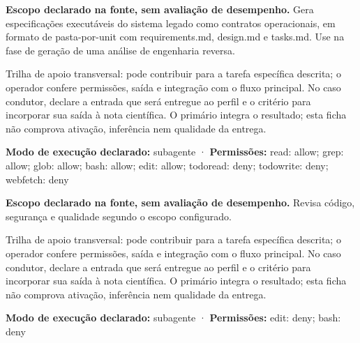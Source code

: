 \begin{descricao}
\textbf{Escopo declarado na fonte, sem avaliação de desempenho.}
Gera especificações executáveis do sistema legado como contratos operacionais, em formato de pasta-por-unit com requirements.md, design.md e tasks.md. Use na fase de geração de uma análise de engenharia reversa.
\end{descricao}

\begin{funcao}
Trilha de apoio transversal: pode contribuir para a tarefa específica descrita; o operador confere permissões, saída e integração com o fluxo principal. No caso condutor, declare a entrada que será entregue ao perfil e o critério para incorporar sua saída à nota científica. O primário integra o resultado; esta ficha não comprova ativação, inferência nem qualidade da entrega.
\end{funcao}

\begin{arquitetura}
\textbf{Modo de execução declarado:} subagente · \textbf{Permissões:} read: allow; grep: allow; glob: allow; bash: allow; edit: allow; todoread: deny; todowrite: deny; webfetch: deny
\end{arquitetura}


\begin{descricao}
\textbf{Escopo declarado na fonte, sem avaliação de desempenho.}
Revisa código, segurança e qualidade segundo o escopo configurado.
\end{descricao}

\begin{funcao}
Trilha de apoio transversal: pode contribuir para a tarefa específica descrita; o operador confere permissões, saída e integração com o fluxo principal. No caso condutor, declare a entrada que será entregue ao perfil e o critério para incorporar sua saída à nota científica. O primário integra o resultado; esta ficha não comprova ativação, inferência nem qualidade da entrega.
\end{funcao}

\begin{arquitetura}
\textbf{Modo de execução declarado:} subagente · \textbf{Permissões:} edit: deny; bash: deny
\end{arquitetura}

